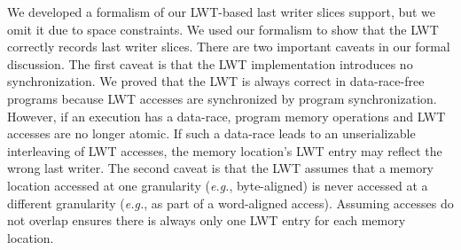 \documentclass[pageno,nohyperref]{jpaper}
\newcommand{\lwt}{LWT\xspace}
\begin{document}
We developed a formalism of our \lwt-based last writer slices support, but we
omit it due to space constraints.  We used our formalism to show that the \lwt
correctly records last writer slices.  There are two important caveats in our
formal discussion.  The first caveat is that the \lwt implementation introduces
no synchronization.  We proved that the \lwt is always correct in
data-race-free programs because \lwt accesses are synchronized by program
synchronization.  However, if an execution has a data-race, program memory
operations and \lwt accesses are no longer atomic.  If such a data-race leads
to an unserializable interleaving of \lwt accesses, the memory location's \lwt
entry may reflect the wrong last writer.  The second caveat is that the \lwt
assumes that a memory location accessed at one granularity ({\em e.g.},
byte-aligned) is never accessed at a different granularity ({\em e.g.}, as part
of a word-aligned access).  Assuming accesses do not overlap ensures there is
always only one \lwt entry for each memory location.
\end{document}
